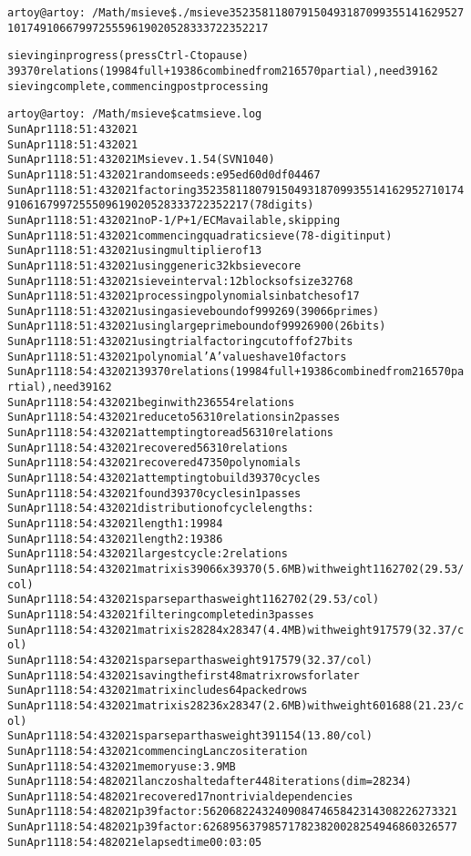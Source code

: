 \documentclass[pdf, unicode, 12pt, a4paper,oneside,fleqn]{article}
\begin{document}
\begin{alltt}
artoy@artoy:~/Math/msieve\$ ./msieve 3523581180791504931870993551416295271017491066799725559619020528333722352217

sieving in progress (press Ctrl-C to pause)
39370 relations (19984 full + 19386 combined from 216570 partial), need 39162
sieving complete, commencing postprocessing

artoy@artoy:~/Math/msieve\$ cat msieve.log
Sun Apr 11 18:51:43 2021  
Sun Apr 11 18:51:43 2021  
Sun Apr 11 18:51:43 2021  Msieve v. 1.54 (SVN 1040)
Sun Apr 11 18:51:43 2021  random seeds: e95ed60d 0df04467
Sun Apr 11 18:51:43 2021  factoring 352358118079150493187099355141629527101749106167997255509619020528333722352217 (78 digits)
Sun Apr 11 18:51:43 2021  no P-1/P+1/ECM available, skipping
Sun Apr 11 18:51:43 2021  commencing quadratic sieve (78-digit input)
Sun Apr 11 18:51:43 2021  using multiplier of 13
Sun Apr 11 18:51:43 2021  using generic 32kb sieve core
Sun Apr 11 18:51:43 2021  sieve interval: 12 blocks of size 32768
Sun Apr 11 18:51:43 2021  processing polynomials in batches of 17
Sun Apr 11 18:51:43 2021  using a sieve bound of 999269 (39066 primes)
Sun Apr 11 18:51:43 2021  using large prime bound of 99926900 (26 bits)
Sun Apr 11 18:51:43 2021  using trial factoring cutoff of 27 bits
Sun Apr 11 18:51:43 2021  polynomial 'A' values have 10 factors
Sun Apr 11 18:54:43 2021  39370 relations (19984 full + 19386 combined from 216570 partial), need 39162
Sun Apr 11 18:54:43 2021  begin with 236554 relations
Sun Apr 11 18:54:43 2021  reduce to 56310 relations in 2 passes
Sun Apr 11 18:54:43 2021  attempting to read 56310 relations
Sun Apr 11 18:54:43 2021  recovered 56310 relations
Sun Apr 11 18:54:43 2021  recovered 47350 polynomials
Sun Apr 11 18:54:43 2021  attempting to build 39370 cycles
Sun Apr 11 18:54:43 2021  found 39370 cycles in 1 passes
Sun Apr 11 18:54:43 2021  distribution of cycle lengths:
Sun Apr 11 18:54:43 2021     length 1 : 19984
Sun Apr 11 18:54:43 2021     length 2 : 19386
Sun Apr 11 18:54:43 2021  largest cycle: 2 relations
Sun Apr 11 18:54:43 2021  matrix is 39066 x 39370 (5.6 MB) with weight 1162702 (29.53/col)
Sun Apr 11 18:54:43 2021  sparse part has weight 1162702 (29.53/col)
Sun Apr 11 18:54:43 2021  filtering completed in 3 passes
Sun Apr 11 18:54:43 2021  matrix is 28284 x 28347 (4.4 MB) with weight 917579 (32.37/col)
Sun Apr 11 18:54:43 2021  sparse part has weight 917579 (32.37/col)
Sun Apr 11 18:54:43 2021  saving the first 48 matrix rows for later
Sun Apr 11 18:54:43 2021  matrix includes 64 packed rows
Sun Apr 11 18:54:43 2021  matrix is 28236 x 28347 (2.6 MB) with weight 601688 (21.23/col)
Sun Apr 11 18:54:43 2021  sparse part has weight 391154 (13.80/col)
Sun Apr 11 18:54:43 2021  commencing Lanczos iteration
Sun Apr 11 18:54:43 2021  memory use: 3.9 MB
Sun Apr 11 18:54:48 2021  lanczos halted after 448 iterations (dim = 28234)
Sun Apr 11 18:54:48 2021  recovered 17 nontrivial dependencies
Sun Apr 11 18:54:48 2021  p39 factor: 562068224324090847465842314308226273321
Sun Apr 11 18:54:48 2021  p39 factor: 626895637985717823820028254946860326577
Sun Apr 11 18:54:48 2021  elapsed time 00:03:05


\end{alltt}
\end{document}
